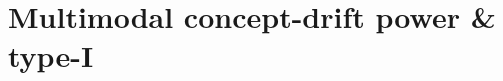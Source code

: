 \documentclass[11pt]{article}
\begin{document}
\section{Multimodal concept-drift power \& type-I}

\end{document}
